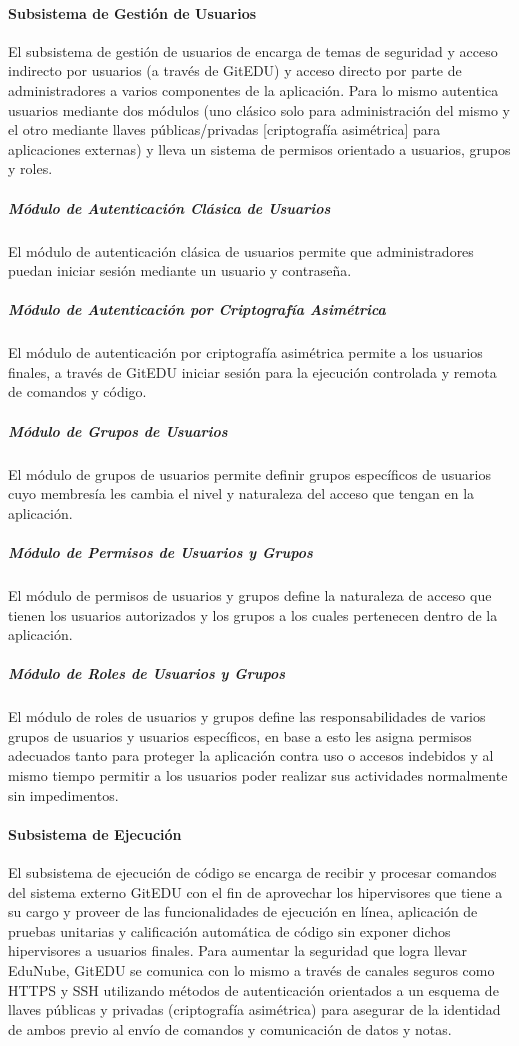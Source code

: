 \paragraph{Subsistema de Gestión de Usuarios}
El subsistema de gestión de usuarios de encarga de temas de seguridad y acceso indirecto por usuarios (a través de GitEDU) y acceso directo por parte de administradores a varios componentes de la aplicación. Para lo mismo autentica usuarios mediante dos módulos (uno clásico solo para administración del mismo y el otro mediante llaves públicas/privadas [criptografía asimétrica] para aplicaciones externas) y lleva un sistema de permisos orientado a usuarios, grupos y roles.

\subparagraph{Módulo de Autenticación Clásica de Usuarios}
El módulo de autenticación clásica de usuarios permite que administradores puedan iniciar sesión mediante un usuario y contraseña.

\subparagraph{Módulo de Autenticación por Criptografía Asimétrica}
El módulo de autenticación por criptografía asimétrica permite a los usuarios finales, a través de GitEDU iniciar sesión para la ejecución controlada y remota de comandos y código.

\subparagraph{Módulo de Grupos de Usuarios}
El módulo de grupos de usuarios permite definir grupos específicos de usuarios cuyo membresía les cambia el nivel y naturaleza del acceso que tengan en la aplicación.

\subparagraph{Módulo de Permisos de Usuarios y Grupos}
El módulo de permisos de usuarios y grupos define la naturaleza de acceso que tienen los usuarios autorizados y los grupos a los cuales pertenecen dentro de la aplicación.

\subparagraph{Módulo de Roles de Usuarios y Grupos}
El módulo de roles de usuarios y grupos define las responsabilidades de varios grupos de usuarios y usuarios específicos, en base a esto les asigna permisos adecuados tanto para proteger la aplicación contra uso o accesos indebidos y al mismo tiempo permitir a los usuarios poder realizar sus actividades normalmente sin impedimentos.

\paragraph{Subsistema de Ejecución}
 
El subsistema de ejecución de código se encarga de recibir y procesar  comandos del sistema externo GitEDU con el fin de aprovechar los hipervisores que tiene a su cargo y proveer de las funcionalidades de ejecución en línea, aplicación de pruebas unitarias y calificación automática de código sin exponer dichos hipervisores a usuarios finales. Para aumentar la seguridad que logra llevar EduNube, GitEDU se comunica con lo mismo a través de canales seguros como HTTPS y SSH utilizando métodos de autenticación orientados a un esquema de llaves públicas y privadas (criptografía asimétrica) para asegurar de la identidad de ambos previo al envío de comandos y comunicación de datos y notas.

